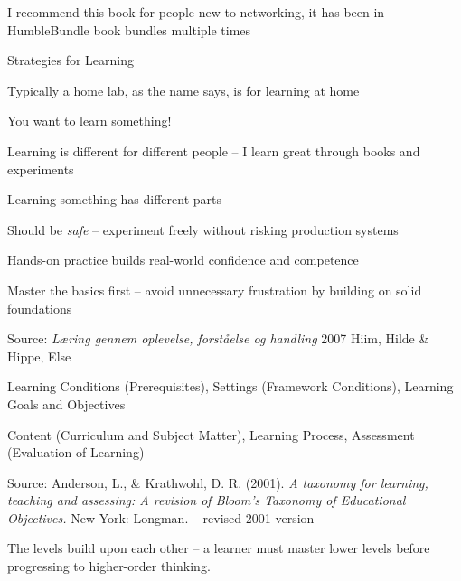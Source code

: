 \documentclass[Screen16to9,17pt]{foils}
\begin{document}
I recommend this book for people new to networking, it has been in HumbleBundle book bundles multiple times



Strategies for Learning
\begin{list1}
\item Typically a home lab, as the name says, is for learning at home
\item You want to learn something!
\item Learning is different for different people -- I learn great through books and experiments
\vskip 2cm
\item Learning something has different parts
\begin{list2}
\item Should be \emph{safe} -- experiment freely without risking production systems
\item Hands-on practice builds real-world confidence and competence
\item Master the basics first -- avoid unnecessary frustration by building on solid foundations
\end{list2}
\end{list1}


Source: \emph{Læring gennem oplevelse, forståelse og handling} 2007 Hiim, Hilde \& Hippe, Else

\begin{list2}
\item Learning Conditions (Prerequisites), Settings (Framework Conditions), Learning Goals and Objectives
\item Content (Curriculum and Subject Matter), Learning Process, Assessment (Evaluation of Learning)
\end{list2}


Source: Anderson, L., \& Krathwohl, D. R. (2001). \emph{A taxonomy for learning, teaching and assessing: A revision of Bloom's Taxonomy of Educational Objectives.} New York: Longman. -- revised 2001 version

The levels build upon each other -- a learner must master lower levels  before progressing to higher-order thinking.

\end{document}
